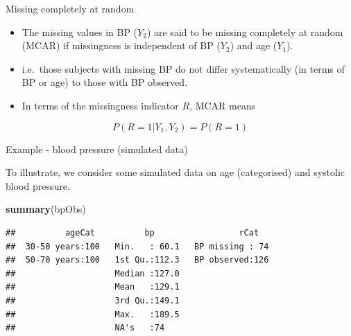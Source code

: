\documentclass[ignorenonframetext,]{beamer}
\newenvironment{Shaded}{\begin{snugshade}}{\end{snugshade}}
\newcommand{\KeywordTok}[1]{\textcolor[rgb]{0.13,0.29,0.53}{\textbf{#1}}}
\newcommand{\NormalTok}[1]{#1}
\providecommand{\tightlist}{%
  \setlength{\itemsep}{0pt}\setlength{\parskip}{0pt}}
\begin{document}
\begin{frame}{Missing completely at random}
\protect\hypertarget{missing-completely-at-random}{}

\begin{itemize}
\tightlist
\item
  The missing values in BP (\(Y_{2}\)) are said to be missing completely
  at random (MCAR) if missingness is independent of BP (\(Y_{2}\)) and
  age (\(Y_{1}\)).
\item
  i.e.~those subjects with missing BP do not differ systematically (in
  terms of BP or age) to those with BP observed.
\item
  In terms of the missingness indicator \(R\), MCAR means
\end{itemize}

\[P(R=1|Y_{1},Y_{2})=P(R=1)\]

\end{frame}

\begin{frame}[fragile]{Example - blood pressure (simulated data)}
\protect\hypertarget{example---blood-pressure-simulated-data}{}

To illustrate, we consider some simulated data on age (categorised) and
systolic blood pressure.

\small

\begin{Shaded}
\begin{Highlighting}[]
\KeywordTok{summary}\NormalTok{(bpObs)}
\end{Highlighting}
\end{Shaded}

\begin{verbatim}
##          ageCat          bp                 rCat    
##  30-50 years:100   Min.   : 60.1   BP missing : 74  
##  50-70 years:100   1st Qu.:112.3   BP observed:126  
##                    Median :127.0                    
##                    Mean   :129.1                    
##                    3rd Qu.:149.1                    
##                    Max.   :189.5                    
##                    NA's   :74
\end{verbatim}

\normalsize

\end{frame}
\end{document}
